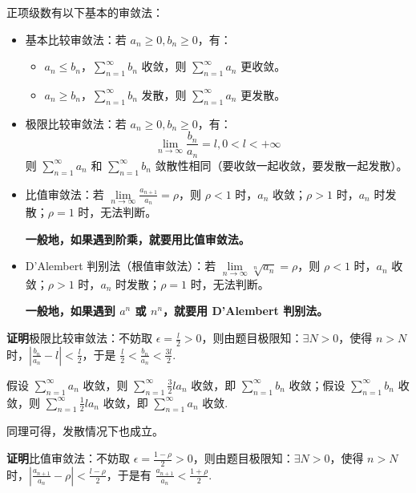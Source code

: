 \documentclass[b5paper]{ctexart}
\newcommand{\jst}{\sum \limits_{n = 1}^{\infty}}
\begin{document}
	正项级数有以下基本的审敛法：
	\begin{itemize}
		\item 基本比较审敛法：若 $a_n \ge 0, b_n \ge 0$，有：
		\begin{itemize}
			\item $a_n \le b_n$，$\jst b_n$ 收敛，则 $\jst a_n$ 更收敛。
			
			\item $a_n \ge b_n$，$\jst b_n$ 发散，则 $\jst a_n$ 更发散。
		\end{itemize}
		
		\item 极限比较审敛法：若 $a_n \ge 0, b_n \ge 0$，有：
		\begin{equation}
			\lim\limits_{n \to \infty} \frac{b_n}{a_n} = l, 0 < l < + \infty
		\end{equation}
		则 $\jst a_n$ 和 $\jst b_n$ 敛散性相同（要收敛一起收敛，要发散一起发散）。
		
		\item 比值审敛法：若 $ \lim\limits_{n \to \infty} \frac{a_{n + 1}}{a_n} = \rho$，则 $\rho < 1$ 时，$a_n$ 收敛；$\rho > 1$ 时，$a_n$ 时发散；$\rho = 1$ 时，无法判断。
		
		\textbf{一般地，如果遇到阶乘，就要用比值审敛法。}
		
		\item D'Alembert 判别法（根值审敛法）：若 $\lim\limits_{n \to \infty} \sqrt[n]{a_n} = \rho$，则 $\rho < 1$ 时，$a_n$ 收敛；$\rho > 1$ 时，$a_n$ 时发散；$\rho = 1$ 时，无法判断。
		
		\textbf{一般地，如果遇到 $a^n$ 或 $n^n$，就要用 D'Alembert 判别法。}
	\end{itemize}
	
	\textbf{证明}极限比较审敛法：不妨取 $\epsilon = \frac{l}{2} > 0$，则由题目极限知：$\exists N > 0$，使得 $n > N$ 时，$|\frac{b_n}{a_n} - l| < \frac{l}{2}$，于是 $\frac{l}{2} < \frac{b_n}{a_n} < \frac{3l}{2}$.
	
	假设 $\jst a_n$ 收敛，则 $\jst \frac{3}{2} l a_n$ 收敛，即 $\jst b_n$ 收敛；假设 $\jst b_n$ 收敛，则 $\jst \frac{1}{2} l a_n$ 收敛，即 $\jst a_n$ 收敛.
	
	同理可得，发散情况下也成立。
	
	\vspace{12pt}
	
	\textbf{证明}比值审敛法：不妨取 $\epsilon = \frac{1 - \rho}{2} > 0$，则由题目极限知：$\exists N > 0$，使得 $n > N$ 时，$|\frac{a_{n + 1}}{a_n} - \rho| < \frac{l - \rho}{2}$，于是有 $\frac{a_{n + 1}}{a_n} < \frac{1 + \rho}{2}$.
	
\end{document}
